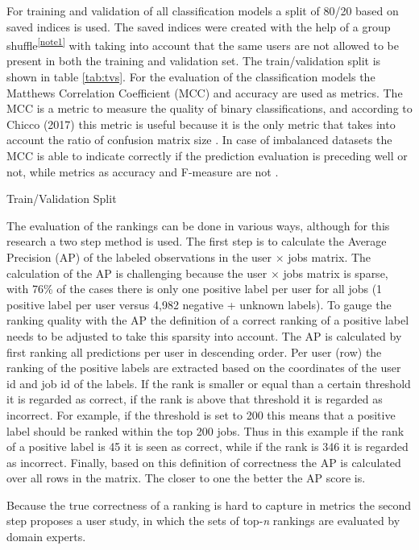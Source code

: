 For training and validation of all classification models a split of 80/20 based on saved indices is used. 
The saved indices were created with the help of a group shuffle\textsuperscript{\ref{note1}} with taking into account that the same users are not allowed to be present in both the training and validation set.
The train/validation split is shown in table \ref{tab:tvs}.
For the evaluation of the classification models the Matthews Correlation Coefficient (MCC) \cite{matthews1975comparison} and accuracy are used as metrics.
The MCC is a metric to measure the quality of binary classifications, and according to Chicco (2017) this metric is useful because it is the only metric that takes into account the ratio of confusion matrix size \cite{chicco2017ten}.
In case of imbalanced datasets the MCC is able to indicate correctly if the prediction evaluation is preceding well or not, while metrics as accuracy and F-measure are not \cite{boughorbel2017optimal}.

\begin{table}[h]
\begin{footnotesize}

\end{footnotesize}
\caption{\label{tab:tvs} \footnotesize{Train/Validation Split}}
\end{table}

The evaluation of the rankings can be done in various ways, although for this research a two step method is used. 
The first step is to calculate the Average Precision (AP) of the labeled observations in the user $\times$ jobs matrix.
The calculation of the AP is challenging because the user $\times$ jobs matrix is sparse, with 76\% of the cases there is only one positive label per user for all jobs (1 positive label per user versus 4,982 negative + unknown labels).
To gauge the ranking quality with the AP the definition of a correct ranking of a positive label needs to be adjusted to take this sparsity into account. 
The AP is calculated by first ranking all predictions per user in descending order.
Per user (row) the ranking of the positive labels are extracted based on the coordinates of the user id and job id of the labels.
If the rank is smaller or equal than a certain threshold it is regarded as correct, if the rank is above that threshold it is regarded as incorrect. 
For example, if the threshold is set to 200 this means that a positive label should be ranked within the top 200 jobs. 
Thus in this example if the rank of a positive label is 45 it is seen as correct, while if the rank is 346 it is regarded as incorrect.
Finally, based on this definition of correctness the AP is calculated over all rows in the matrix.
The closer to one the better the AP score is.

Because the true correctness of a ranking is hard to capture in metrics the second step proposes a user study, in which the sets of top-\textit{n} rankings are evaluated by domain experts. 
